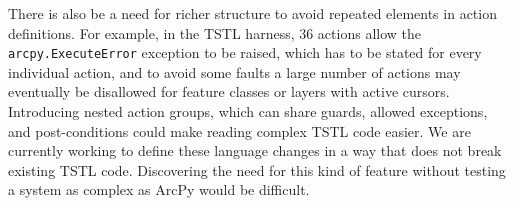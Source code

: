 There is also be a need for richer structure to avoid repeated
elements in action definitions.  For example, in the TSTL harness, 36
actions allow the {\tt arcpy.ExecuteError} exception to be raised,
which has to be stated for every individual action, and to avoid some
faults a large number of actions may eventually be disallowed for
feature classes or layers with active cursors.  Introducing nested
action groups, which can share guards, allowed exceptions, and
post-conditions could make reading complex TSTL code easier.  We are
currently working to define these language changes in a way that does
not break existing TSTL code.  Discovering the need for this kind of
feature without testing a system as complex as ArcPy would be
difficult.
